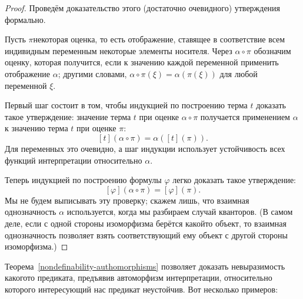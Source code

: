 \begin{proof}
Проведём доказательство этого (достаточно очевидного) утверждения
формально.

Пусть $\pi$\т некоторая оценка, то есть отображение, ставящее в
соответствие всем индивидным переменным некоторые элементы
носителя. Через $\alpha\circ\pi$ обозначим оценку, которая
получится, если к значению каждой переменной применить
отображение $\alpha$; другими словами,
$\alpha\circ\pi(\xi)=\alpha(\pi(\xi))$ для любой переменной
$\xi$.

Первый шаг состоит в том, чтобы индукцией по построению терма
$t$ доказать такое утверждение: значение терма $t$ при оценке
$\alpha\circ\pi$ получается применением $\alpha$ к значению
терма $t$ при оценке $\pi$:
        $$
[t](\alpha\circ\pi)=\alpha([t](\pi)).
        $$
Для переменных это очевидно, а шаг индукции использует
устойчивость всех функций интерпретации относительно $\alpha$.

Теперь индукцией по построению формулы $\varphi$ легко доказать такое
утверждение:
        $$
[\varphi](\alpha\circ\pi) = [\varphi] (\pi).
        $$
Мы не будем выписывать эту проверку; скажем лишь, что
взаимная однозначность $\alpha$ используется, когда мы разбираем
случай кванторов. (В самом деле, если с одной стороны изоморфизма
берётся какой\д то объект, то взаимная однозначность позволяет
взять соответствующий ему объект с другой стороны изоморфизма.)
\end{proof}

Теорема~\ref{nondefinability-authomorphisms} позволяет доказать
невыразимость какого\д то предиката, предъявив автоморфизм
интерпретации, относительно которого интересующий нас предикат
неустойчив. Вот несколько примеров:


